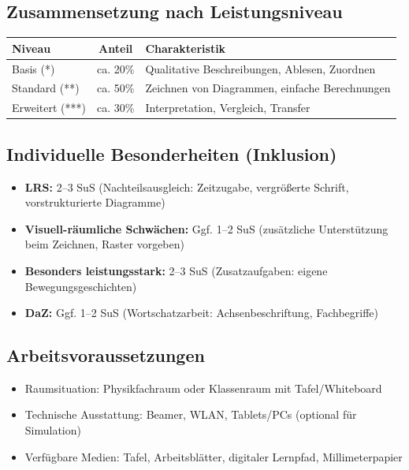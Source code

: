 \documentclass[11pt,a4paper]{article}
\begin{document}
\subsection{Zusammensetzung nach Leistungsniveau}
\begin{tabular}{|l|c|l|}
\hline
\textbf{Niveau} & \textbf{Anteil} & \textbf{Charakteristik} \\
\hline
Basis (*) & ca. 20\% & Qualitative Beschreibungen, Ablesen, Zuordnen \\
\hline
Standard (**) & ca. 50\% & Zeichnen von Diagrammen, einfache Berechnungen \\
\hline
Erweitert (***) & ca. 30\% & Interpretation, Vergleich, Transfer \\
\hline
\end{tabular}

\subsection{Individuelle Besonderheiten (Inklusion)}
\begin{itemize}
    \item \textbf{LRS:} 2--3 SuS (Nachteilsausgleich: Zeitzugabe, vergrößerte Schrift, vorstrukturierte Diagramme)
    \item \textbf{Visuell-räumliche Schwächen:} Ggf. 1--2 SuS (zusätzliche Unterstützung beim Zeichnen, Raster vorgeben)
    \item \textbf{Besonders leistungsstark:} 2--3 SuS (Zusatzaufgaben: eigene Bewegungsgeschichten)
    \item \textbf{DaZ:} Ggf. 1--2 SuS (Wortschatzarbeit: Achsenbeschriftung, Fachbegriffe)
\end{itemize}

\subsection{Arbeitsvoraussetzungen}
\begin{itemize}
    \item Raumsituation: Physikfachraum oder Klassenraum mit Tafel/Whiteboard
    \item Technische Ausstattung: Beamer, WLAN, Tablets/PCs (optional für Simulation)
    \item Verfügbare Medien: Tafel, Arbeitsblätter, digitaler Lernpfad, Millimeterpapier
\end{itemize}
\end{document}

